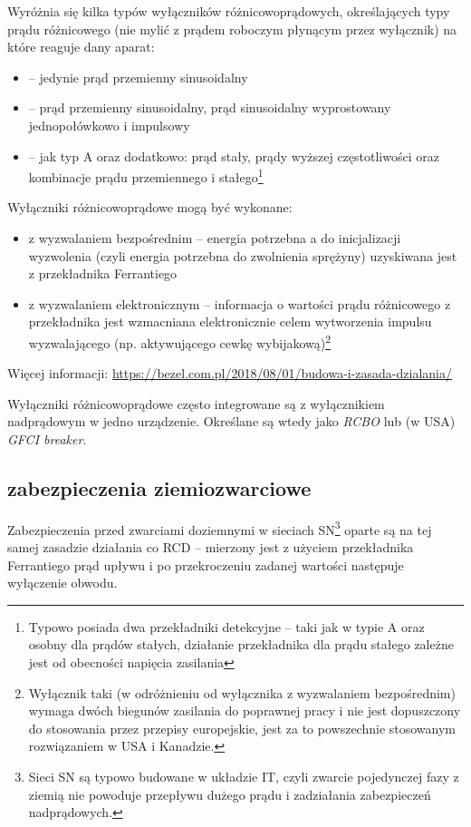Wyróżnia się kilka typów wyłączników różnicowoprądowych, określających typy prądu różnicowego (nie mylić z prądem roboczym płynącym przez wyłącznik) na które reaguje dany aparat:
\begin{itemize}
	\item {} – jedynie prąd przemienny sinusoidalny 
	\item {}  – prąd przemienny sinusoidalny, prąd sinusoidalny wyprostowany jednopołówkowo i impulsowy
	\item {}  – jak typ A oraz dodatkowo: prąd stały, prądy wyższej częstotliwości oraz kombinacje prądu przemiennego i stałego\footnote{
		Typowo posiada dwa przekładniki detekcyjne – taki jak w typie A oraz osobny dla prądów stałych, działanie przekładnika dla prądu stałego zależne jest od obecności napięcia zasilania}
\end{itemize}

Wyłączniki różnicowoprądowe mogą być wykonane:
\begin{itemize}
	\item z wyzwalaniem bezpośrednim – energia potrzebna a do inicjalizacji wyzwolenia (czyli energia potrzebna do zwolnienia sprężyny) uzyskiwana jest z przekładnika Ferrantiego
	\item z wyzwalaniem elektronicznym – informacja o wartości prądu różnicowego z przekładnika jest wzmacniana elektronicznie celem wytworzenia impulsu wyzwalającego (np. aktywującego cewkę wybijakową)\footnote{
		Wyłącznik taki (w odróżnieniu od wyłącznika z wyzwalaniem bezpośrednim) wymaga dwóch biegunów zasilania do poprawnej pracy i nie jest dopuszczony do stosowania przez przepisy europejskie,
		jest za to powszechnie stosowanym rozwiązaniem w USA i Kanadzie.
	}
\end{itemize}
Więcej informacji: \url{https://bezel.com.pl/2018/08/01/budowa-i-zasada-dzialania/}

Wyłączniki różnicowoprądowe często integrowane są z wyłącznikiem nadprądowym w jedno urządzenie.
Określane są wtedy jako \textit{RCBO} lub (w USA) \textit{GFCI breaker}.

\subsection{zabezpieczenia ziemiozwarciowe}

Zabezpieczenia przed zwarciami doziemnymi w sieciach SN\footnote{Sieci SN są typowo budowane w układzie IT, czyli zwarcie pojedynczej fazy z ziemią nie powoduje przepływu dużego prądu i zadziałania zabezpieczeń nadprądowych.} oparte są na tej samej zasadzie działania co RCD – mierzony jest z użyciem przekładnika Ferrantiego prąd upływu i po przekroczeniu zadanej wartości następuje wyłączenie obwodu.


